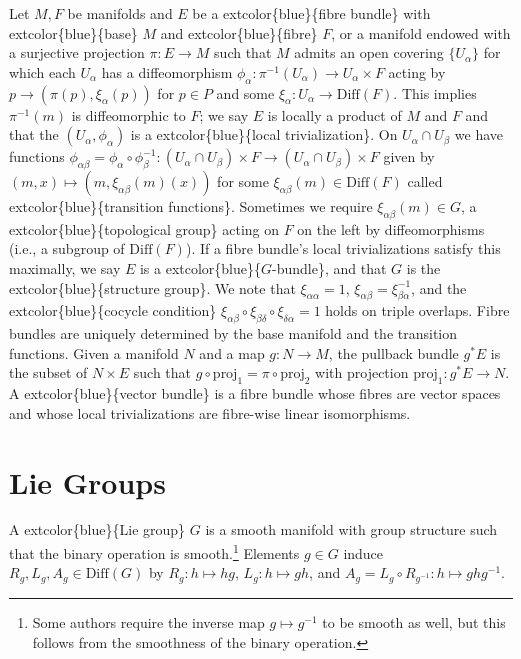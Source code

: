 \documentclass[
]{book}
\begin{document}
Let \(M, F\) be manifolds and \(E\) be a extcolor\{blue\}\{fibre bundle\} with extcolor\{blue\}\{base\} \(M\) and extcolor\{blue\}\{fibre\} \(F\), or a manifold endowed with a surjective projection \(\pi : E \to M\) such that \(M\) admits an open covering \(\{U_\alpha\}\) for which each \(U_\alpha\) has a diffeomorphism \(\phi_\alpha : \pi^{-1}(U_\alpha) \to U_\alpha \times F\) acting by \(p \to (\pi(p), \xi_\alpha(p))\) for \(p \in P\) and some \(\xi_\alpha : U_\alpha \to \text{Diff}(F)\). This implies \(\pi^{-1}(m)\) is diffeomorphic to \(F\); we say \(E\) is locally a product of \(M\) and \(F\) and that the \((U_\alpha, \phi_\alpha)\) is a extcolor\{blue\}\{local trivialization\}. On \(U_\alpha \cap U_\beta\) we have functions \(\phi_{\alpha\beta} = \phi_\alpha \circ \phi_\beta^{-1} : (U_\alpha \cap U_\beta) \times F \to (U_\alpha \cap U_\beta) \times F\) given by \((m, x) \mapsto (m, \xi_{\alpha\beta}(m)(x))\) for some \(\xi_{\alpha\beta}(m) \in \text{Diff}(F)\) called extcolor\{blue\}\{transition functions\}. Sometimes we require \(\xi_{\alpha\beta}(m) \in G\), a extcolor\{blue\}\{topological group\} acting on \(F\) on the left by diffeomorphisms (i.e., a subgroup of \(\text{Diff}(F)\)). If a fibre bundle's local trivializations satisfy this maximally, we say \(E\) is a extcolor\{blue\}\{\(G\)-bundle\}, and that \(G\) is the extcolor\{blue\}\{structure group\}. We note that \(\xi_{\alpha\alpha} = 1\), \(\xi_{\alpha\beta} = \xi_{\beta\alpha}^{-1}\), and the extcolor\{blue\}\{cocycle condition\} \(\xi_{\alpha\beta} \circ \xi_{\beta\delta} \circ \xi_{\delta\alpha} = 1\) holds on triple overlaps. Fibre bundles are uniquely determined by the base manifold and the transition functions. Given a manifold \(N\) and a map \(g : N \to M\), the pullback bundle \(g^*E\) is the subset of \(N \times E\) such that \(g \circ \text{proj}_{1} = \pi \circ \text{proj}_{2}\) with projection \(\text{proj}_{1} : g^*E \to N\). A extcolor\{blue\}\{vector bundle\} is a fibre bundle whose fibres are vector spaces and whose local trivializations are fibre-wise linear isomorphisms.

\hypertarget{lie-groups}{%
\section{Lie Groups}\label{lie-groups}}

A extcolor\{blue\}\{Lie group\} \(G\) is a smooth manifold with group structure such that the binary operation is smooth.\footnote{Some authors require the inverse map \(g \mapsto g^{-1}\) to be smooth as well, but this follows from the smoothness of the binary operation.}
Elements \(g \in G\) induce \(R_g, L_g, A_g \in \text{Diff}(G)\) by \(R_g : h \mapsto hg\), \(L_g : h \mapsto gh\), and \(A_g = L_g \circ R_{g^{-1}} : h \mapsto ghg^{-1}\).
\end{document}
